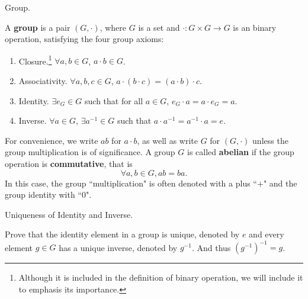 \documentclass[../book.tex]{subfiles}
\begin{document}
\begin{dfn} Group. 

A \textbf{group} is a pair $(G, \cdot)$, where $G$ is a set and $\cdot : G\times G \rightarrow G$ is an binary operation, satisfying the four group axioms:
\begin{enumerate}
\item Closure.\footnote{Although it is included in the definition of binary operation, we will include it to emphasis its importance.}  $ \forall a,b\in G$, $a\cdot b \in G$.
\item Associativity. $ \forall a,b,c\in G$, $a \cdot (b \cdot c) = (a \cdot b) \cdot c$.
\item Identity. $ \exists e_G \in G$ such that for all $a \in G$, 
$e_G \cdot a = a \cdot e_G=a$.
\item Inverse. $ \forall a\in G$,  $ \exists a^{-1} \in G$ such that $a \cdot a^{-1} = a^{-1} \cdot a = e$.
\end{enumerate}
For convenience, we write $ab$ for $a \cdot b$, 
as well as write $G$ for $(G,\cdot)$ 
unless the group multiplication is of significance. 
A group $G$ is called \textbf{abelian} 
if the group operation is \textbf{commutative}, that is
\[\forall a, b \in G, ab = ba.\]
In this case, the group ``multiplication" is often denoted with a plus ``$+$"
and the group identity with ``$0$".

\end{dfn}


\begin{ex} Uniqueness of Identity and Inverse.

    Prove that the identity element in a group is unique, denoted by $e$ and every element $g \in G$ has a unique inverse, denoted by $g^{-1}$. And thus $(g^{-1})^{-1}=g$.
\end{ex}
\end{document}
